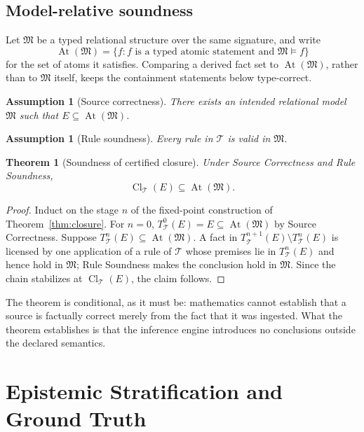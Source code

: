 \documentclass[11pt]{article}
\newtheorem{theorem}[definition]{Theorem}
\newtheorem{assumption}[definition]{Assumption}
\newcommand{\Cl}{\operatorname{Cl}}
\newcommand{\At}{\operatorname{At}}
\newcommand{\T}{\mathcal{T}}
\begin{document}
\subsection{Model-relative soundness}

Let $\mathfrak{M}$ be a typed relational structure over the same signature, and write
\[
\At(\mathfrak{M})=\{f : f\text{ is a typed atomic statement and }\mathfrak{M}\models f\}
\]
for the set of atoms it satisfies. Comparing a derived fact set to $\At(\mathfrak{M})$, rather than to $\mathfrak{M}$ itself, keeps the containment statements below type-correct.

\begin{assumption}[Source correctness]
There exists an intended relational model $\mathfrak{M}$ such that $E\subseteq\At(\mathfrak{M})$.
\end{assumption}

\begin{assumption}[Rule soundness]
Every rule in $\T$ is valid in $\mathfrak{M}$.
\end{assumption}

\begin{theorem}[Soundness of certified closure]
\label{thm:closure-sound}
Under Source Correctness and Rule Soundness,
\[
\Cl_{\T}(E)\subseteq \At(\mathfrak{M}).
\]
\end{theorem}
\begin{proof}
Induct on the stage $n$ of the fixed-point construction of Theorem~\ref{thm:closure}. For $n=0$, $T_{\T}^{0}(E)=E\subseteq\At(\mathfrak{M})$ by Source Correctness. Suppose $T_{\T}^{n}(E)\subseteq\At(\mathfrak{M})$. A fact in $T_{\T}^{n+1}(E)\setminus T_{\T}^{n}(E)$ is licensed by one application of a rule of $\T$ whose premises lie in $T_{\T}^{n}(E)$ and hence hold in $\mathfrak{M}$; Rule Soundness makes the conclusion hold in $\mathfrak{M}$. Since the chain stabilizes at $\Cl_{\T}(E)$, the claim follows.
\end{proof}

The theorem is conditional, as it must be: mathematics cannot establish that a source is factually correct merely from the fact that it was ingested. What the theorem establishes is that the inference engine introduces no conclusions outside the declared semantics.

\section{Epistemic Stratification and Ground Truth}
\end{document}
